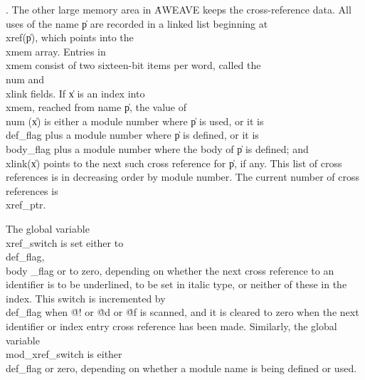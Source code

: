 . The other large memory area in \.{AWEAVE} keeps the cross-reference data.
All uses of the name \|p are recorded in a linked list beginning at
\\{xref}\?(\?\|p\?)\?, which points into the \\{xmem} array. Entries in %
\\{xmem} consist
of two sixteen-bit items per word, called the \\{num} and \\{xlink} fields.
If \|x is an index into \\{xmem}, reached from name \|p, the value of \\{num}%
\?(\?\|x\?)\?
is either a module number where \|p is used, or it is \\{def\_flag} plus a
module number where \|p is defined, or it is \\{body\_flag} plus a module
number where the body of \|p is defined; and \\{xlink}\?(\?\|x\?)\? points to
the next
such cross reference for \|p, if any. This list of cross references is in
decreasing order by module number. The current number of cross references
is \\{xref\_ptr}.

The global variable \\{xref\_switch} is set either to \\{def\_flag}, \\{body%
\_flag} or
to zero, depending on whether the next cross reference to an identifier is to
be underlined, to be set in italic type, or neither of these in the index.
This  switch is incremented by \\{def\_flag} when
\.{@!} or \.{@d} or \.{@f} is scanned, and it is cleared to zero when
the next identifier or index entry cross reference has been made. Similarly,
the global variable \\{mod\_xref\_switch} is either \\{def\_flag} or zero,
depending
on whether a module name is being defined or used.

